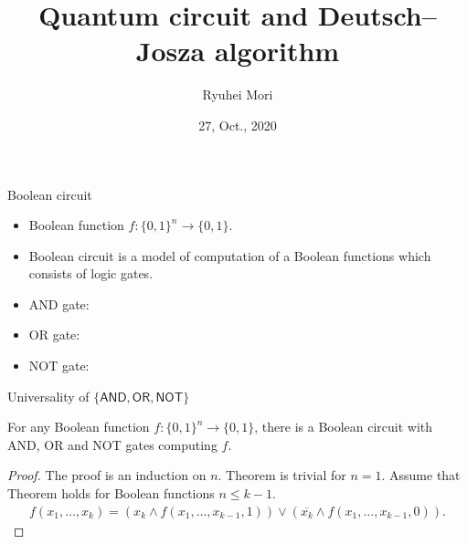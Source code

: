 \documentclass{beamer}
\title{Quantum circuit and Deutsch--Josza algorithm}
\author{Ryuhei Mori}
\institute{Tokyo Institute of Technology}
\date{27, Oct., 2020}
\newcommand\emm[1]{\textcolor{redorange}{{#1}}}
\begin{document}
\begin{frame}[plain]
\maketitle
\end{frame}



\begin{frame}{Boolean circuit}
\begin{itemize}
\setlength{\itemsep}{2em}
\item Boolean function $f\colon \{0,1\}^n\to\{0,1\}$.
\item \emm{Boolean circuit} is a model of computation of a Boolean functions which consists of logic \emm{gates}.
\item AND gate:
\item OR gate:
\item NOT gate:
\end{itemize}
\end{frame}

\begin{frame}{Universality of $\{\mathsf{AND}, \mathsf{OR},\mathsf{NOT}\}$}
\begin{theorem}
For \emm{any} Boolean function $f\colon \{0,1\}^n\to\{0,1\}$, there is a Boolean circuit with AND, OR and NOT gates computing $f$.
\end{theorem}
\begin{proof}
The proof is an induction on $n$. Theorem is trivial for $n=1$.
Assume that Theorem holds for Boolean functions $n \le k-1$.
\begin{align*}
f(x_1,\dotsc,x_k) = (x_k \wedge f(x_1,\dotsc,x_{k-1}, 1)) \vee (\overline{x_k} \wedge f(x_1,\dotsc,x_{k-1}, 0)).
\end{align*}
\end{proof}
\end{frame}
\end{document}
